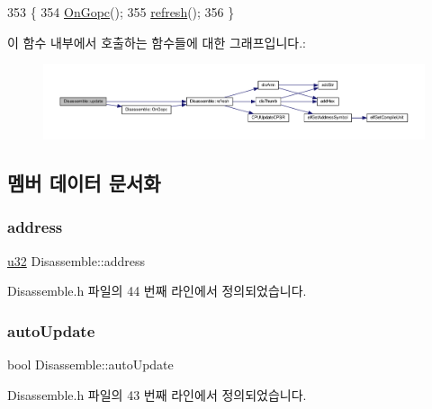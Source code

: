 \begin{DoxyCode}
353 \{
354   \mbox{\hyperlink{class_disassemble_ad757b7defc104599f1a20730cf7f3d63}{OnGopc}}();
355   \mbox{\hyperlink{class_disassemble_a7cdf11d53ce0f170ad7dd8fc66961805}{refresh}}();
356 \}
\end{DoxyCode}
이 함수 내부에서 호출하는 함수들에 대한 그래프입니다.\+:
\nopagebreak
\begin{figure}[H]
\begin{center}
\leavevmode
\includegraphics[width=350pt]{class_disassemble_a30fc26e4204bd886f7cd8eb0c6c22e88_cgraph}
\end{center}
\end{figure}


\subsection{멤버 데이터 문서화}
\mbox{\label{class_disassemble_a960ac8317ada7182e59132a3ee4afb48}} 
\subsubsection{\texorpdfstring{address}{address}}
{\footnotesize\ttfamily \mbox{\hyperlink{_system_8h_a10e94b422ef0c20dcdec20d31a1f5049}{u32}} Disassemble\+::address}



Disassemble.\+h 파일의 44 번째 라인에서 정의되었습니다.

\mbox{\label{class_disassemble_a347234b8c8fa03c0bc21e39c03efc36d}} 
\subsubsection{\texorpdfstring{auto\+Update}{autoUpdate}}
{\footnotesize\ttfamily bool Disassemble\+::auto\+Update}



Disassemble.\+h 파일의 43 번째 라인에서 정의되었습니다.

